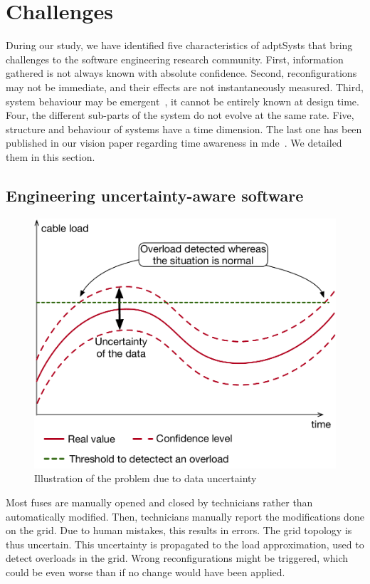 \section{Challenges}

During our study, we have identified five characteristics of \glspl{adptSyst} that bring challenges to the software engineering research community.
First, information gathered is not always known with absolute confidence.
Second, reconfigurations may not be immediate, and their effects are not instantaneously measured.
Third, system behaviour may be emergent~\cite{zio2011uncertainties}, \ie it cannot be entirely known at design time.
Four, the different sub-parts of the system do not evolve at the same rate.
Five, structure and behaviour of systems have a time dimension.
The last one has been published in our vision paper regarding time awareness in \gls{mde}~\cite{DBLP:conf/models/Benelallam0MFBB17}.
We detailed them in this section.

\subsection{Engineering uncertainty-aware software}
\label{sec:intro:challenges:duc}

\begin{figure}
	\centering
	\includegraphics[width=.6\linewidth]{img/chapt-intro/challenges/duc}
	\caption{Illustration of the problem due to data uncertainty}
	\label{fig:intro:chal:duc}
\end{figure}

Most fuses are manually opened and closed by technicians rather than automatically modified.
Then, technicians manually report the modifications done on the grid.
Due to human mistakes, this results in errors.
The grid topology is thus uncertain.
This uncertainty is propagated to the load approximation, used to detect overloads in the grid.
Wrong reconfigurations might be triggered, which could be even worse than if no change would have been applied.

